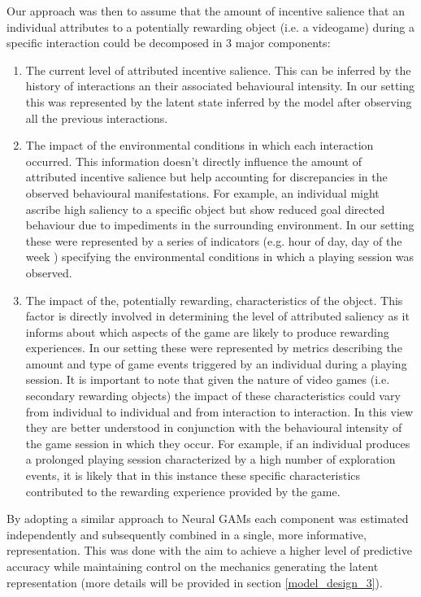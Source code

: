 Our approach was then to assume that the amount of incentive salience that an individual attributes to a potentially rewarding object (i.e. a videogame) during a specific interaction could be decomposed in 3 major components:
\begin{enumerate}
    \item The current level of attributed incentive salience. This can be inferred by the history of interactions an their associated behavioural intensity. In our setting this was represented by the latent state inferred by the model after observing all the previous interactions.
    \item The impact of the environmental conditions in which each interaction occurred. This information doesn't directly influence the amount of attributed incentive salience but help accounting for discrepancies in the observed behavioural manifestations. For example, an individual might ascribe high saliency to a specific object but show reduced goal directed behaviour due to impediments in the surrounding environment. In our setting these were represented by a series of indicators (e.g. hour of day, day of the week ) specifying the environmental conditions in which a playing session was observed.
    \item The impact of the, potentially rewarding, characteristics of the object. This factor is directly involved in determining the level of attributed saliency as it informs about which aspects of the game are likely to produce rewarding experiences. In our setting these were represented by metrics describing the amount and type of game events triggered by an individual during a playing session. It is important to note that given the nature of video games (i.e. secondary rewarding objects) the impact of these characteristics could vary from individual to individual and from interaction to interaction. In this view they are better understood in conjunction with the behavioural intensity of the game session in which they occur. For example, if an individual produces a prolonged playing session characterized by a high number of exploration events, it is likely that in this instance these specific characteristics contributed to the rewarding experience provided by the game.
\end{enumerate}

By adopting a similar approach to Neural GAMs \cite{agarwal2021neural} each component was estimated independently and subsequently combined in a single, more informative, representation. This was done with the aim to achieve a higher level of predictive accuracy while maintaining control on the mechanics generating the latent representation (more details will be provided in section \ref{model_design_3}). 

